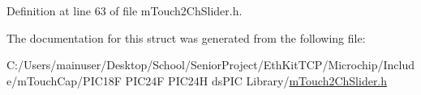 Definition at line 63 of file m\+Touch2\+Ch\+Slider.\+h.



The documentation for this struct was generated from the following file\+:\begin{DoxyCompactItemize}
\item 
C\+:/\+Users/mainuser/\+Desktop/\+School/\+Senior\+Project/\+Eth\+Kit\+T\+C\+P/\+Microchip/\+Include/m\+Touch\+Cap/\+P\+I\+C18\+F P\+I\+C24\+F P\+I\+C24\+H ds\+P\+I\+C Library/\hyperlink{m_touch2_ch_slider_8h}{m\+Touch2\+Ch\+Slider.\+h}\end{DoxyCompactItemize}
